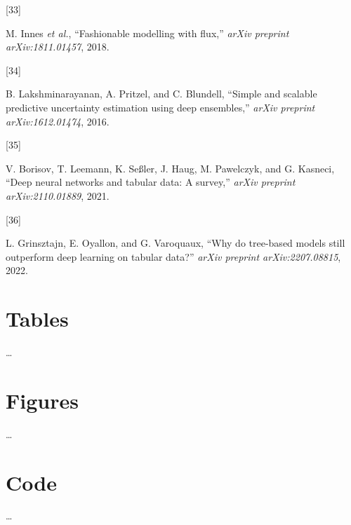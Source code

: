 \documentclass[
  conference]{IEEEtran}
\newlength{\cslhangindent}
\newlength{\csllabelwidth}
\newlength{\cslentryspacingunit} %
\newenvironment{CSLReferences}[2] %
 {%
  \setlength{\parindent}{0pt}
  \ifodd #1
  \let\oldpar\par
  \def\par{\hangindent=\cslhangindent\oldpar}
  \fi
  \setlength{\parskip}{#2\cslentryspacingunit}
 }%
 {}
\newcommand{\CSLLeftMargin}[1]{\parbox[t]{\csllabelwidth}{#1}}
\newcommand{\CSLRightInline}[1]{\parbox[t]{\linewidth - \csllabelwidth}{#1}\break}
\begin{document}
\begin{CSLReferences}{0}{0}
\leavevmode{}%
\CSLLeftMargin{{[}33{]} }%
\CSLRightInline{M. Innes \emph{et al.}, {``Fashionable modelling with
flux,''} \emph{arXiv preprint arXiv:1811.01457}, 2018.}

\leavevmode{}%
\CSLLeftMargin{{[}34{]} }%
\CSLRightInline{B. Lakshminarayanan, A. Pritzel, and C. Blundell,
{``Simple and scalable predictive uncertainty estimation using deep
ensembles,''} \emph{arXiv preprint arXiv:1612.01474}, 2016.}

\leavevmode{}%
\CSLLeftMargin{{[}35{]} }%
\CSLRightInline{V. Borisov, T. Leemann, K. Seßler, J. Haug, M.
Pawelczyk, and G. Kasneci, {``Deep neural networks and tabular data: A
survey,''} \emph{arXiv preprint arXiv:2110.01889}, 2021.}

\leavevmode{}%
\CSLLeftMargin{{[}36{]} }%
\CSLRightInline{L. Grinsztajn, E. Oyallon, and G. Varoquaux, {``Why do
tree-based models still outperform deep learning on tabular data?''}
\emph{arXiv preprint arXiv:2207.08815}, 2022.}

\end{CSLReferences}

\pagebreak

\hypertarget{tables}{%
\section{Tables}\label{tables}}

\ldots{}

\pagebreak

\hypertarget{figures}{%
\section{Figures}\label{figures}}

\ldots{}

\pagebreak

\hypertarget{code}{%
\section{Code}\label{code}}

\ldots{}
\end{document}
